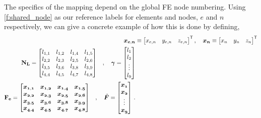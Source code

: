 \documentclass[11pt]{iopart}
\begin{document}
%
The specifics of the mapping depend on the global FE node numbering. Using \cref{f:shared_node} as our reference labels for elements and nodes, $e$ and $n$ respectively, we can give a concrete example of how this is done by defining,
\begin{subequations}
    \begin{align}
        \vec{x_{e,n}} & \equiv	\begin{bmatrix}
            x_{e,n} & y_{e,n} & z_{e,n}
        \end{bmatrix}^{\mathsf{T}}, \quad
        \vec{x_{n}} \equiv	\begin{bmatrix}
            x_{n} & y_{n} & z_{n}
        \end{bmatrix}^{\mathsf{T}}            \\
        \begin{split}
            \mtx{N_{L}} &=	\begin{bmatrix}
                l_{1,1} & l_{1,2} & l_{1,4} & l_{1,5} \\
                l_{2,2} & l_{2,3} & l_{2,5} & l_{2,6} \\
                l_{3,5} & l_{3,6} & l_{3,8} & l_{3,9} \\
                l_{4,4} & l_{4,5} & l_{4,7} & l_{4,8} \\
            \end{bmatrix}
        \end{split}
        , \quad
        \vec{\gamma} =   \begin{bmatrix}
            l_1    \\
            l_2    \\
            \vdots \\
            l_9
        \end{bmatrix}                          \\
        \begin{split}
            \mtx{F_{e}} &=	\begin{bmatrix}
                \vec{x_{1,1}} & \vec{x_{1,2}} & \vec{x_{1,4}} & \vec{x_{1,5}} \\
                \vec{x_{2,2}} & \vec{x_{2,3}} & \vec{x_{2,5}} & \vec{x_{2,6}} \\
                \vec{x_{3,5}} & \vec{x_{3,6}} & \vec{x_{3,8}} & \vec{x_{3,9}} \\
                \vec{x_{4,4}} & \vec{x_{4,5}} & \vec{x_{4,7}} & \vec{x_{4,8}} \\
            \end{bmatrix}
        \end{split}
        ,\quad
        \vec{\tilde{F}} = 	\begin{bmatrix}
            \vec{x_{1}} \\
            \vec{x_{2}} \\
            \vdots      \\
            \vec{x_{9}}
        \end{bmatrix}\,.\label{e:force_imp}
    \end{align}
\end{subequations}
\end{document}
